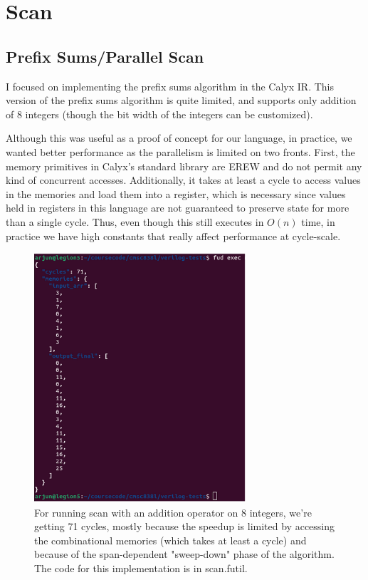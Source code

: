 \documentclass[12pt]{article}
\begin{document}
\section{Scan}
\subsection{Prefix Sums/Parallel Scan}
I focused on implementing the prefix sums algorithm\cite{blelloch_prefix_1990} in the Calyx IR. This version of the prefix
sums algorithm is quite limited, and supports only addition of 8 integers (though the bit width of the integers
can be customized).

Although this was useful as a proof of concept for our language, in practice, we wanted better performance as the parallelism
is limited on two fronts. First, the memory primitives in Calyx's standard library are EREW and do not permit
any kind of concurrent accesses. Additionally, it takes at least a cycle to access values in the memories and load
them into a register, which is necessary since values held in registers in this language are not guaranteed
to preserve state for more than a single cycle. Thus, even though this still executes in $O(n)$ time,
in practice we have high constants that really affect performance at cycle-scale.

\begin{figure}[H]
    \centering
    \includegraphics[height=25em]{images/prefix_sums.png}
    \caption{For running scan with an addition operator on 8 integers, we're getting 71 cycles, mostly because the speedup
    is limited by accessing the combinational memories (which takes at least a cycle) and because
    of the span-dependent "sweep-down" phase of the algorithm. The code for this implementation is in scan.futil.}
\end{figure}
\end{document}
